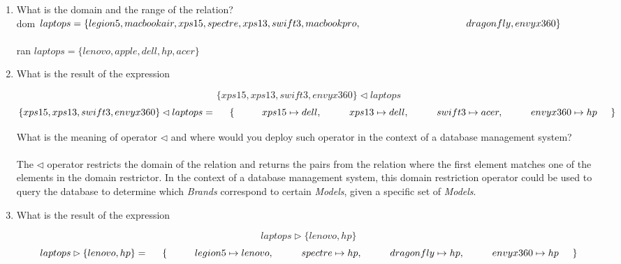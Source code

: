 \documentclass[12pt]{article}
\begin{document}
\begin{enumerate}

\item What is the domain and the range of the relation?\\
dom $laptops = \{legion5, macbookair, xps15, spectre, xps13, swift3, macbookpro,\\
\hspace*{38mm}dragonfly, envyx360\}$\\\\
ran $laptops = \{ lenovo, apple, dell, hp, acer\}$

\item What is the result of the expression

\[ \{ xps15, xps13, swift3, envyx360 \}  \lhd laptops \]
\[ \{ xps15, xps13, swift3, envyx360 \}  \lhd laptops =\\
\hspace{5mm} \{ \\
\hspace{10mm} xps15 \mapsto dell,\\
\hspace{10mm} xps13 \mapsto dell,\\
\hspace{10mm} swift3 \mapsto acer,\\
\hspace{10mm} envyx360 \mapsto hp\\
\hspace{5mm} \}
\]

\noindent What is the meaning of operator $\lhd$ and where would you deploy such operator in the context of a database management system?\\\\
The $\lhd$ operator restricts the domain of the relation and returns the pairs from the relation where the first element matches one of the elements in the domain restrictor. In the context of a database management system, this domain restriction operator could be used to query the database to determine which \textit{Brands} correspond to certain \textit{Models}, given a specific set of \textit{Models}.

\item What is the result of the expression

\[ laptops \rhd \{ lenovo, hp \} \]
\[ laptops \rhd \{ lenovo, hp \} =\\
\hspace{5mm} \{ \\
\hspace{10mm} legion5 \mapsto lenovo,\\
\hspace{10mm} spectre \mapsto hp,\\
\hspace{10mm} dragonfly \mapsto hp,\\
\hspace{10mm} envyx360 \mapsto hp\\
\hspace{5mm} \}
\]


\end{enumerate}
\end{document}

